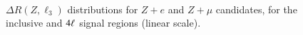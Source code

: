\begin{appendices}
\begin{figure}[h]
{  }
   \\
  \caption{$\Delta R(Z,\ell_3)$ distributions for $Z+e$ and $Z+\mu$ candidates, for the inclusive and $4\ell$ signal regions (linear scale).}
  \label{fig:SR-dR-1-linear}
\end{figure}


\end{appendices}
